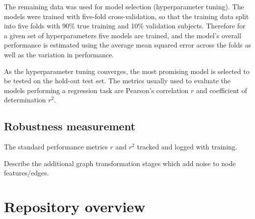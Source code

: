 The remaining data was used for model selection (hyperparameter tuning). The models were trained with five-fold cross-validation, so that the training data split into five folds with 90\% true training and 10\% validation subjects. Therefore for a given set of hyperparameters five models are trained, and the model's overall performance is estimated using the average mean squared error across the folds as well as the variation in performance. 

As the hyperparameter tuning converges, the most promising model is selected to be tested on the hold-out test set. The metrics usually used to evaluate the models performing a regression task are Pearson's correlation $r$ and coefficient of determination $r^2$.

\subsection{Robustness measurement}


The standard performance metrics $r$ and $r^2$ tracked and logged with training.

Describe the additional graph transformation stages which add noise to node features/edges.


\section{Repository overview}

